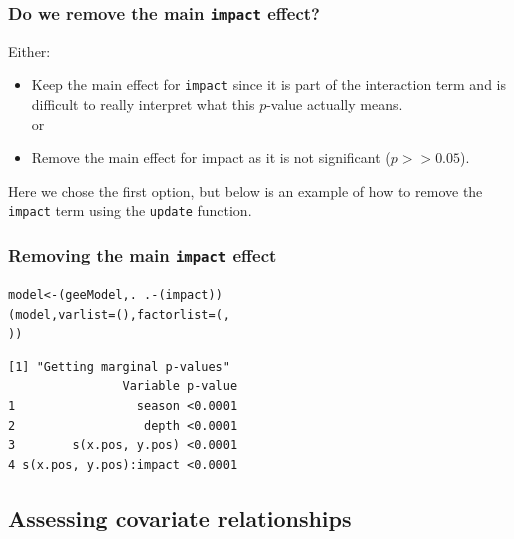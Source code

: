 \begin{frame}[fragile]
\frametitle{Do we remove the main {\tt impact} effect?}
Either:
\begin{itemize}
\item Keep the main effect for {\tt impact} since it is part of the interaction term and is difficult to really interpret what this $p$-value actually means.\\
or\\
\item Remove the main effect for impact as it is not significant ($p>>0.05$).
\end{itemize}

\bigskip
Here we chose the first option, but below is an example of how to remove the {\tt impact} term using the {\tt update} function.
\end{frame}

\begin{frame}[fragile]
\frametitle{Removing the main {\tt impact} effect}
\begin{knitrout}\footnotesize
{}\color{fgcolor}\begin{kframe}
\begin{alltt}
model <- (geeModel, . ~ . - (impact))
(model, varlist = (), factorlist = (, 
    ))
\end{alltt}
\begin{verbatim}
[1] "Getting marginal p-values"
                Variable p-value
1                 season <0.0001
2                  depth <0.0001
3        s(x.pos, y.pos) <0.0001
4 s(x.pos, y.pos):impact <0.0001
\end{verbatim}
\end{kframe}
\end{knitrout}

\end{frame}


\subsection{Assessing covariate relationships}

